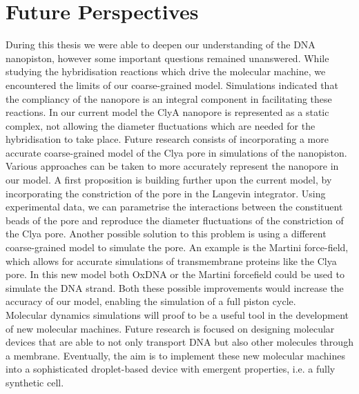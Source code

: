 \section{Future Perspectives}

During this thesis we were able to deepen our understanding of the DNA
nanopiston, however some important questions remained unanswered. While studying the
hybridisation reactions which drive the molecular machine, we encountered the limits of
our coarse-grained model. Simulations indicated that the compliancy of the nanopore
is an integral component in facilitating these reactions. In our current model the ClyA
nanopore is represented as a static complex, not allowing the diameter fluctuations which
are needed for the hybridisation to take place.
Future research consists of incorporating a more accurate coarse-grained model of the
Clya pore in simulations of the nanopiston.\\

Various approaches can be taken to more accurately represent the nanopore in our model.
A first proposition is building further upon the current model, by incorporating the
constriction of the pore in the Langevin integrator. Using experimental data, we can
parametrise the interactions between the constituent beads of the pore and reproduce the
diameter fluctuations of the constriction of the Clya pore. Another possible
solution to this problem is using a different coarse-grained model to simulate the
pore. An example is the Martini force-field, which allows for accurate simulations of
transmembrane proteins like the Clya pore. In this new model both OxDNA or the Martini
forcefield could be used to simulate the DNA strand. Both these possible improvements
would increase the accuracy of our model, enabling the simulation of a full piston
cycle.\\

Molecular dynamics simulations will proof to be a useful tool in the development of
new molecular machines. Future research is focused on designing molecular devices that
are able to not only transport DNA but also other molecules through a membrane.
Eventually, the aim is to implement these new molecular machines into a sophisticated
droplet-based device with emergent properties, i.e. a fully synthetic cell.

